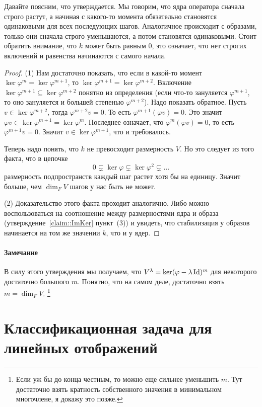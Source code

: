 Давайте поясним, что утверждается.
Мы говорим, что ядра оператора сначала строго растут, а начиная с какого-то момента обязательно становятся одинаковыми для всех последующих шагов.
Аналогичное происходит с образами, только они сначала строго уменьшаются, а потом становятся одинаковыми.
Стоит обратить внимание, что $k$ может быть равным $0$, это означает, что нет строгих включений и равенства начинаются с самого начала.

\begin{proof}

(1) Нам достаточно показать, что если в какой-то момент $\ker \varphi^m = \ker\varphi^{m+1}$, то $\ker \varphi^{m+1} = \ker\varphi^{m+2}$.
Включение $\ker \varphi^{m+1}\subseteq \ker \varphi^{m+2}$ понятно из определения (если что-то зануляется $\varphi^{m+1}$, то оно зануляется и большей степенью $\varphi^{m+2}$).
Надо показать обратное.
Пусть $v\in \ker \varphi^{m+2}$, тогда $\varphi^{m+2}v = 0$.
То есть $\varphi^{m+1}(\varphi v) = 0$.
Это значит $\varphi v \in \ker \varphi^{m+1} = \ker \varphi^m$.
Последнее означает, что $\varphi^m(\varphi v) = 0$, то есть $\varphi^{m+1} v = 0$.
Значит $v\in \ker \varphi^{m+1}$, что и требовалось.

Теперь надо понять, что $k$ не превосходит размерность $V$.
Но это следует из того факта, что в цепочке
\[
0\subsetneq \ker \varphi \subsetneq\ker\varphi^2\subsetneq \ldots
\]
размерность подпространств каждый шаг растет хотя бы на единицу.
Значит больше, чем $\dim_F V$ шагов у нас быть не может.

(2) Доказательство этого факта проходит аналогично.
Либо можно воспользоваться на соотношение между размерностями ядра и образа (утверждение~\ref{claim::ImKer} пункт~(3)) и увидеть, что стабилизация у образов начинается на том же значении $k$, что и у ядер.
\end{proof}

\paragraph{Замечание}

В силу этого утверждения мы получаем, что $V^\lambda = \ker (\varphi - \lambda \operatorname{Id})^m$ для некоторого достаточно большого $m$.
Понятно, что на самом деле, достаточно взять $m = \dim_F V$.%
\footnote{Если уж бы до конца честным, то можно еще сильнее уменьшить $m$.
Тут достаточно взять кратность собственного значения в минимальном многочлене, я докажу это позже.}


\newpage
\section{Классификационная задача для линейных отображений}

